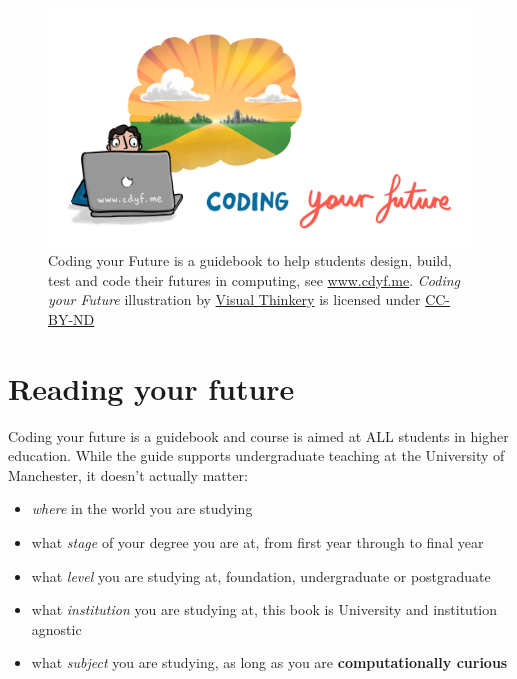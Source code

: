 \documentclass[
  12pt,
]{book}
\providecommand{\tightlist}{%
  \setlength{\itemsep}{0pt}\setlength{\parskip}{0pt}}
\begin{document}
\begin{figure}

{\centering \includegraphics[width=0.98\linewidth]{images/CDYF-vision} 

}

\caption{Coding your Future is a guidebook to help students design, build, test and code their futures in computing, see \href{https://www.cdyf.me}{www.cdyf.me}. \emph{Coding your Future} illustration by \href{https://visualthinkery.com/}{Visual Thinkery} is licensed under \href{https://creativecommons.org/licenses/by-nd/4.0/}{CC-BY-ND}}\label{fig:cdyf-fig}
\end{figure}



\hypertarget{reading}{%
\section{Reading your future}\label{reading}}

Coding your future is a guidebook and course is aimed at ALL students in higher education. While the guide supports undergraduate teaching at the University of Manchester, it doesn't actually matter:

\begin{itemize}
\tightlist
\item
  \emph{where} in the world you are studying
\item
  what \emph{stage} of your degree you are at, from first year through to final year
\item
  what \emph{level} you are studying at, foundation, undergraduate or postgraduate
\item
  what \emph{institution} you are studying at, this book is University and institution agnostic
\item
  what \emph{subject} you are studying, as long as you are \textbf{computationally curious}
\end{itemize}
\end{document}
